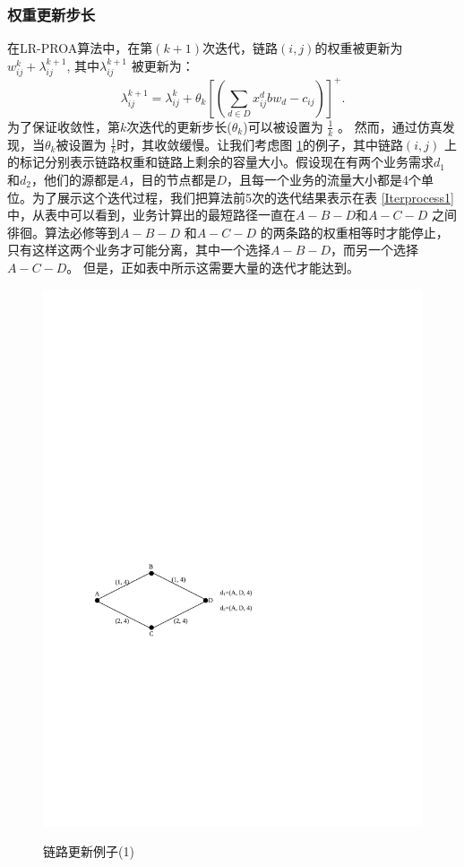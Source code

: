 \subsubsection{权重更新步长}
在LR-PROA算法中，在第$(k+1)$次迭代，链路$(i,j)$的权重被更新为$w_{ij}^{k} + \lambda_{ij}^{k+1}$, 其中$\lambda_{ij}^{k+1}$ 被更新为：
\begin{equation}\label{Iter}
\lambda_{ij}^{k+1} = \lambda_{ij}^k + \theta_k[(\sum\limits_{d \in D}x_{ij}^dbw_d - c_{ij})]^+.
\end{equation}
为了保证收敛性，第$k$次迭代的更新步长($\theta_k$)可以被设置为 $\frac{1}{k}$ 。 然而，通过仿真发现，当$\theta_k$被设置为 $\frac{1}{k}$时，其收敛缓慢。让我们考虑图 \ref{u1}的例子，其中链路$(i,j)$ 上的标记分别表示链路权重和链路上剩余的容量大小。假设现在有两个业务需求$d_1$ 和$d_2$，他们的源都是$A$，目的节点都是$D$，且每一个业务的流量大小都是4个单位。为了展示这个迭代过程，我们把算法前5次的迭代结果表示在表 \ref{Iterprocess1}中，从表中可以看到，业务计算出的最短路径一直在$A-B-D$和$A-C-D$ 之间徘徊。算法必修等到$A-B-D$ 和$A-C-D$ 的两条路的权重相等时才能停止，只有这样这两个业务才可能分离，其中一个选择$A-B-D$，而另一个选择$A-C-D$。 但是，正如表中所示这需要大量的迭代才能达到。
\begin{figure}
\setlength{\belowcaptionskip}{-0.1cm}
\begin{center}
{\includegraphics[width=0.4 \textwidth]{figures/IterNum.pdf}}
\end{center}
\caption{{\footnotesize{链路更新例子(1)}}}
\label{u1}
\end{figure}
